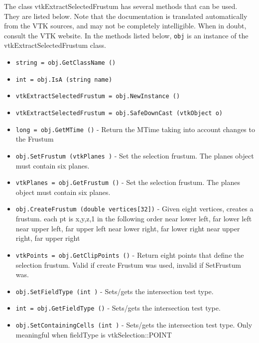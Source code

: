 The class vtkExtractSelectedFrustum has several methods that can be used.
  They are listed below.
Note that the documentation is translated automatically from the VTK sources,
and may not be completely intelligible.  When in doubt, consult the VTK website.
In the methods listed below, \verb|obj| is an instance of the vtkExtractSelectedFrustum class.
\begin{itemize}
\item  \verb|string = obj.GetClassName ()|

\item  \verb|int = obj.IsA (string name)|

\item  \verb|vtkExtractSelectedFrustum = obj.NewInstance ()|

\item  \verb|vtkExtractSelectedFrustum = obj.SafeDownCast (vtkObject o)|

\item  \verb|long = obj.GetMTime ()| -  Return the MTime taking into account changes to the Frustum

\item  \verb|obj.SetFrustum (vtkPlanes )| -  Set the selection frustum. The planes object must contain six planes.

\item  \verb|vtkPlanes = obj.GetFrustum ()| -  Set the selection frustum. The planes object must contain six planes.

\item  \verb|obj.CreateFrustum (double vertices[32])| -  Given eight vertices, creates a frustum.
 each pt is x,y,z,1
 in the following order
 near lower left, far lower left
 near upper left, far upper left
 near lower right, far lower right
 near upper right, far upper right

\item  \verb|vtkPoints = obj.GetClipPoints ()| -  Return eight points that define the selection frustum. Valid if
 create Frustum was used, invalid if SetFrustum was.

\item  \verb|obj.SetFieldType (int )| -  Sets/gets the intersection test type.

\item  \verb|int = obj.GetFieldType ()| -  Sets/gets the intersection test type.

\item  \verb|obj.SetContainingCells (int )| -  Sets/gets the intersection test type. Only meaningful when fieldType is 
 vtkSelection::POINT


\end{itemize}
